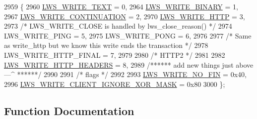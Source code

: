 \begin{DoxyCode}
2959                         \{
2960         \hyperlink{group__sending-data_gga98b099cf8c1c7e38ad78501f270e193da80e8f169fda236c56bfb795ed62903db}{LWS\_WRITE\_TEXT}                                            = 0,
2964         \hyperlink{group__sending-data_gga98b099cf8c1c7e38ad78501f270e193daf6486c0dba50c44198100717721d9ab2}{LWS\_WRITE\_BINARY}                                        = 1,
2967         \hyperlink{group__sending-data_gga98b099cf8c1c7e38ad78501f270e193da10047eb05b5e1c298151dc47a5b44826}{LWS\_WRITE\_CONTINUATION}                                    = 2,
2970         \hyperlink{group__sending-data_gga98b099cf8c1c7e38ad78501f270e193dabb6705e1d1327cdda5025be28f07712e}{LWS\_WRITE\_HTTP}                                            = 3,
2973         \textcolor{comment}{/* LWS\_WRITE\_CLOSE is handled by lws\_close\_reason() */}
2974         LWS\_WRITE\_PING                                          = 5,
2975         LWS\_WRITE\_PONG                                          = 6,
2976 
2977         \textcolor{comment}{/* Same as write\_http but we know this write ends the transaction */}
2978         LWS\_WRITE\_HTTP\_FINAL                                    = 7,
2979 
2980         \textcolor{comment}{/* HTTP2 */}
2981 
2982         \hyperlink{group__sending-data_gga98b099cf8c1c7e38ad78501f270e193dafe5a38e940ce56708ac814627e9c0917}{LWS\_WRITE\_HTTP\_HEADERS}                                    = 8,
2989         \textcolor{comment}{/****** add new things just above ---^ ******/}
2990 
2991         \textcolor{comment}{/* flags */}
2992 
2993         \hyperlink{group__sending-data_gga98b099cf8c1c7e38ad78501f270e193da115440f272a5d55518adfc8099acfee3}{LWS\_WRITE\_NO\_FIN} = 0x40,
2996         \hyperlink{group__sending-data_gga98b099cf8c1c7e38ad78501f270e193da220d8e8652d9b97fb66e476e2a60ffce}{LWS\_WRITE\_CLIENT\_IGNORE\_XOR\_MASK} = 0x80
3000 \};
\end{DoxyCode}


\subsection{Function Documentation}
